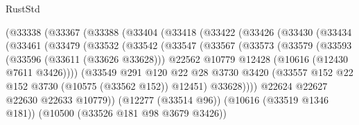 \begin{lexlean}{RustStd}
\begin{coremodule}
                      (@33338
                        (@33367
                          (@33388
                            (@33404
                              (@33418
                                (@33422
                                  (@33426
                                    (@33430
                                      (@33434
                                        (@33461
                                          (@33479
                                            (@33532
                                              (@33542
                                                (@33547
                                                  (@33567
                                                    (@33573
                                                      (@33579
                                                        (@33593
                                                          (@33596 (@33611 (@33626 @33628)))
                                                          @22562
                                                          @10779
                                                          @12428
                                                          (@10616 (@12430 @7611 @3426))))
                                                      (@33549
                                                        @291
                                                        @120
                                                        @22
                                                        @28
                                                        @3730
                                                        @3420
                                                        (@33557
                                                          @152
                                                          @22
                                                          @152
                                                          @3730
                                                          (@10575 (@33562 @152))
                                                          @12451)
                                                        @33628))))
                                                @22624
                                                @22627
                                                @22630
                                                @22633
                                                @10779))
                                            (@12277 (@33514 @96))
                                            (@10616 (@33519 @1346 @181))
                                            (@10500 (@33526 @181 @98 @3679 @3426))

\end{coremodule}
\end{lexlean}
